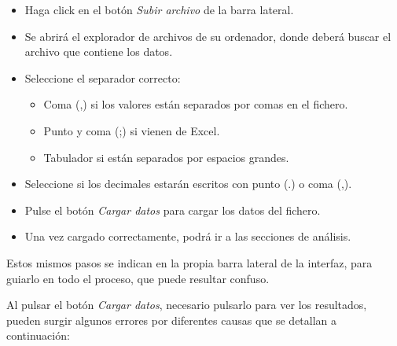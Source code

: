 \begin{itemize}
    \item Haga click en el botón \textit{Subir archivo} de la barra lateral.
    \item Se abrirá el explorador de archivos de su ordenador, donde deberá buscar el archivo que
    contiene los datos.
    \item Seleccione el separador correcto:
    \begin{itemize}
        \item Coma (,) si los valores están separados por comas en el fichero.
        \item Punto y coma (;) si vienen de Excel.
        \item Tabulador si están separados por espacios grandes.
    \end{itemize}
    \item Seleccione si los decimales estarán escritos con punto (.) o coma (,).
    \item Pulse el botón \textit{Cargar datos} para cargar los datos del fichero.
    \item Una vez cargado correctamente, podrá ir a las secciones de análisis.
\end{itemize}

Estos mismos pasos se indican en la propia barra lateral de la interfaz, para guiarlo en todo el proceso, que puede resultar confuso. \newline

Al pulsar el botón \textit{Cargar datos}, necesario pulsarlo para ver los resultados, pueden surgir algunos errores por diferentes causas que se detallan a continuación:

